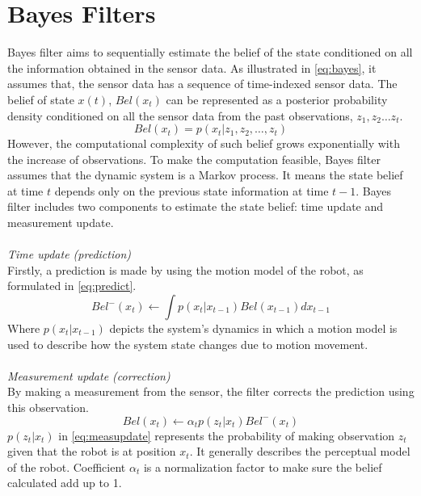 \section{Bayes Filters}\label{sec:2.1}
Bayes filter aims to sequentially estimate the belief of the state conditioned on all the information obtained in the sensor data. As illustrated in \autoref{eq:bayes}, it assumes that, the sensor data has a sequence of time-indexed sensor data. The belief of state $x(t)$, $Bel(x_{t})$ can be represented as a posterior probability density conditioned on all the sensor data from the past observations, $z_{1}, z_{2} \ldots z_{t}$.
\begin{equation}
\label{eq:bayes}
Bel(x_{t}) = p(x_{t}|z_{1}, z_{2}, \ldots, z_{t})
\end{equation}
However, the computational complexity of such belief grows exponentially with the increase of observations. To make the computation feasible, Bayes filter assumes that the dynamic system is a Markov process. It means the state belief at time $t$ depends only on the previous state information at time $t-1$. Bayes filter includes two components to estimate the state belief: time update and measurement update.
\\
\\
\noindent \textit{Time update (prediction)}\\
Firstly, a prediction is made by using the motion model of the robot, as formulated in \autoref{eq:predict}.
\begin{equation}
\label{eq:predict}
Bel^{-}(x_{t}) \leftarrow \int p(x_{t}|x_{t-1})Bel(x_{t-1})dx_{t-1}
\end{equation}
Where $p(x_{t}|x_{t-1})$ depicts the system's dynamics in which a motion model is used to describe how the system state changes due to motion movement.
\\
\\
\noindent \textit{Measurement update (correction)}\\
By making a measurement from the sensor, the filter corrects the prediction using this observation.
\begin{equation}
\label{eq:measupdate}
Bel(x_{t}) \leftarrow \alpha_{t}p(z_{t}|x_{t})Bel^{-}(x_{t})
\end{equation}
$p(z_{t}|x_{t})$ in \autoref{eq:measupdate} represents the probability of making observation $z_{t}$ given that the robot is at position $x_{t}$. It generally describes the perceptual model of the robot. Coefficient $\alpha_{t}$ is a normalization factor to make sure the belief calculated add up to 1.

